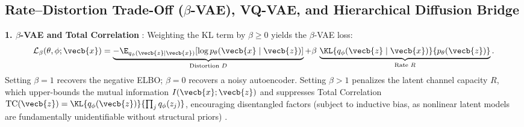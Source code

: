 \documentclass[../../../../master.tex]{subfiles}
\begin{document}
\subsection{Rate--Distortion Trade-Off ($\beta$-VAE), VQ-VAE, and Hierarchical Diffusion Bridge}

\begin{coremath}
\textbf{1. $\beta$-VAE and Total Correlation} : Weighting the KL term by $\beta \ge 0$ yields the $\beta$-VAE loss:
\begin{equation}\label{eq:vae:beta_vae}
  \mathcal{L}_\beta(\theta, \phi; \vecb{x})
  = \underbrace{-\E_{q_\phi(\vecb{z}\mid\vecb{x})}[\log p_\theta(\vecb{x}\mid\vecb{z})]}_{\text{Distortion } D}
  + \beta\,\underbrace{\KL{q_\phi(\vecb{z}\mid\vecb{x})}{p_\theta(\vecb{z})}}_{\text{Rate } R}.
\end{equation}
Setting $\beta=1$ recovers the negative ELBO; $\beta=0$ recovers a noisy autoencoder. Setting $\beta > 1$ penalizes the latent channel capacity $R$, which upper-bounds the mutual information $I(\vecb{x}; \vecb{z})$ and suppresses Total Correlation $\mathrm{TC}(\vecb{z}) = \KL{q_\phi(\vecb{z})}{\prod_j q_\phi(z_j)}$, encouraging disentangled factors (subject to inductive bias, as nonlinear latent models are fundamentally unidentifiable without structural priors)  .


\end{coremath}
\end{document}
